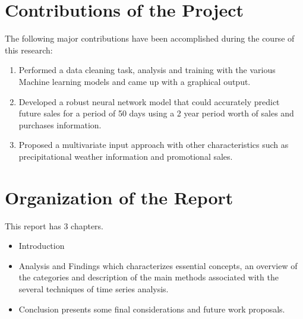 \documentclass[12pt]{report}
\begin{document}
\section{Contributions of the Project}

The following major contributions have been accomplished during the course of this research:

\begin{enumerate}[topsep=0pt]

\item Performed a data cleaning task, analysis and training with the various Machine learning models and came up with a graphical output.

\item Developed a robust neural network model that could accurately predict future sales for a period of 50 days using a 2 year period worth of sales and purchases information.

\item Proposed a multivariate input approach with other characteristics such as precipitational weather information and promotional sales.

\end{enumerate}






\section{Organization of the Report}

This report has 3 chapters. 

\begin{itemize}
	
	\item   Introduction
	\item   Analysis and Findings which characterizes essential concepts, an overview of the categories and description of the main methods associated with the several techniques of time series analysis.
	\item 	Conclusion presents some final considerations and future work proposals.
\end{itemize}

\end{document}

